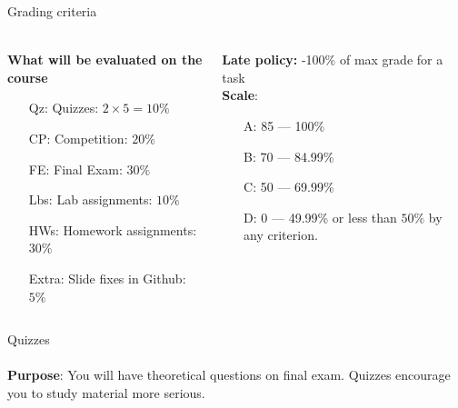 \documentclass[aspectratio=169]{beamer}
\begin{document}
\begin{frame}[t]{Grading criteria}
    \framesubtitle{}
    \begin{columns}[T,onlytextwidth]
        \begin{column}{0.49\textwidth}
            \textbf{What will be evaluated on the course}
            \begin{itemize}
                \item[Qz:] Quizzes: $2\times 5=10\%$ 
                \item[CP:] Competition: $20\%$
                \item[FE:] Final Exam: $30\%$
                \item[Lbs:] Lab assignments: $10\%$
                \item[HWs:] Homework assignments: $30\%$
                \item[Extra:] Slide fixes in Github: $5\%$ 
            \end{itemize}
        \end{column}
        \begin{column}{0.49\textwidth}
            \textbf{Late policy:} -100\% of max grade for a task \\
            \textbf{Scale}:
            \begin{itemize}
                \item[A:] 85 --- 100\%
                \item[B:] 70 --- 84.99\%
                \item[C:] 50 --- 69.99\%
                \item[D:] 0 --- 49.99\% or less than $50\%$ by any criterion.
            \end{itemize}
        \end{column}
    \end{columns}
\end{frame}

\begin{frame}[t]{Quizzes}
\framesubtitle{}
    \textbf{Purpose}: You will have theoretical questions on final exam. Quizzes encourage you to study material more serious.
\end{frame}
\end{document}
